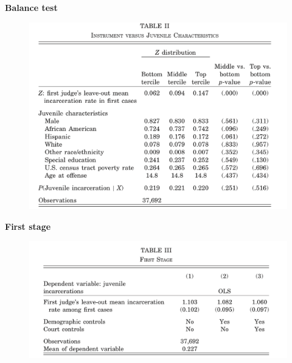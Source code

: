\documentclass[notes=show]{beamer}
\begin{document}
\begin{frame}[plain]

	\begin{center}
	\textbf{Balance test}
	\end{center}
	
	\begin{figure}
	\includegraphics[scale=0.15]{./lecture_includes/balance.png}
	\end{figure}
\end{frame}

\begin{frame}[plain]

	\begin{center}
	\textbf{First stage}
	\end{center}
	
	\begin{figure}
	\includegraphics[scale=0.15]{./lecture_includes/firststage.png}
	\end{figure}
\end{frame}
\end{document}
